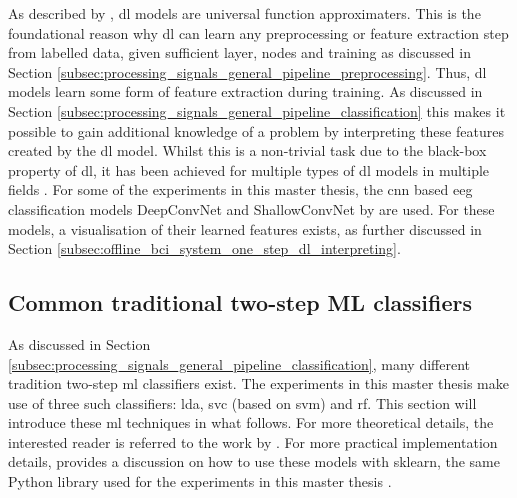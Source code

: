 As described by \citet{nn_can_learn_from_raw}, \gls{dl} models are universal function approximaters.
This is the foundational reason why \gls{dl} can learn any preprocessing or feature extraction step from labelled data, given sufficient layer, nodes and training as discussed in Section \ref{subsec:processing_signals_general_pipeline_preprocessing}.
Thus, \gls{dl} models learn some form of feature extraction during training.
As discussed in Section \ref{subsec:processing_signals_general_pipeline_classification} this makes it possible to gain additional knowledge of a problem by interpreting these features created by the \gls{dl} model.
Whilst this is a non-trivial task due to the black-box property of \gls{dl}, it has been achieved for multiple types of \gls{dl} models in multiple fields \citep{eeg_model_hbm, black_box_insight1, black_box_insight2}.
For some of the experiments in this master thesis, the \gls{cnn} based \gls{eeg} classification models DeepConvNet and ShallowConvNet by \citet{eeg_model_hbm} are used. 
For these models, a visualisation of their learned features exists, as further discussed in Section \ref{subsec:offline_bci_system_one_step_dl_interpreting}.


\subsection{Common traditional two-step ML classifiers}
\label{subsec:processing_signals_ml_and_dl_ml_classifiers}



As discussed in Section \ref{subsec:processing_signals_general_pipeline_classification}, many different tradition two-step \gls{ml} classifiers exist.
The experiments in this master thesis make use of three such classifiers: \gls{lda}, \gls{svc} (based on \gls{svm}) and \gls{rf}.
This section will introduce these \gls{ml} techniques in what follows.
For more theoretical details, the interested reader is referred to the work by \citet{ml_book}.
For more practical implementation details, \citet{ml_dl_book} provides a discussion on how to use these models with \gls{sklearn}, the same Python library used for the experiments in this master thesis \citep{sklearn}.



